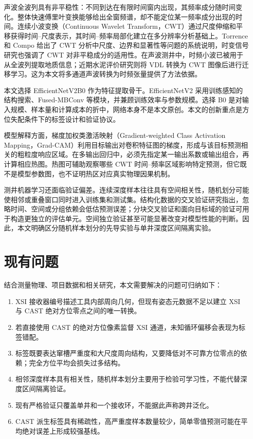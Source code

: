 声波全波列具有非平稳性：不同到达在有限时间窗内出现，其频率成分随时间变化。整体快速傅里叶变换能够给出全窗频谱，却不能定位某一频率成分出现的时间。连续小波变换（Continuous Wavelet Transform，CWT）通过尺度伸缩和平移获得时间--尺度表示，其时间--频率局部化建立在多分辨率分析基础上\cite{Mallat1989Multiresolution}。Torrence 和 Compo 给出了 CWT 分析中尺度、边界和显著性等问题的系统说明\cite{Torrence1998WaveletGuide}，时变信号研究也强调了 CWT 对非平稳成分的适用性\cite{Tary2018TimeVaryingCWT}。在声波测井中，时频小波已被用于从全波列提取地质信息\cite{Saito1997WaveletAcoustic}；近期水泥评价研究则将 VDL 转换为 CWT 图像后进行迁移学习\cite{Abdollahian2024TransferCement}。这为本文将多通道声波转换为时频张量提供了方法依据。

本文选择 EfficientNetV2B0 作为特征提取骨干。EfficientNetV2 采用训练感知的结构搜索、Fused-MBConv 等模块，并兼顾训练效率与参数规模\cite{Tan2021EfficientNetV2}。选择 B0 是对输入规模、样本量和计算成本的折中，网络本身不是本文原创。本文的创新重点是方位失配条件下的标签设计和验证协议。

模型解释方面，梯度加权类激活映射（Gradient-weighted Class Activation Mapping，Grad-CAM）利用目标输出对卷积特征图的梯度，形成与该目标预测相关的粗粒度响应区域\cite{Selvaraju2017GradCAM}。在多输出回归中，必须先指定某一输出系数或输出组合，再计算相应热图。热图可辅助观察哪些 CWT 时间--频率区域影响特定预测，但它既不是模型参数图，也不证明热区对应真实物理因果机制。

测井机器学习还面临验证偏差。连续深度样本往往具有空间相关性，随机划分可能使相邻或重叠窗口同时进入训练集和测试集。结构化数据的交叉验证研究指出，忽略时间、空间或分组依赖会低估预测误差\cite{Roberts2017CrossValidation}；分块交叉验证和面向目标域的验证可用于构造更独立的评估单元\cite{Valavi2019BlockCV,Meyer2018TargetValidation}。空间独立验证甚至可能显著改变对模型性能的判断\cite{Ploton2020SpatialValidation}。因此，本文明确区分随机样本划分的先导实验与单井深度区间隔离实验。

\section{现有问题}

结合测量物理、项目数据和相关研究，本文需要解决的问题可归纳如下：

\begin{enumerate}
  \item XSI 接收器编号描述工具内部周向几何，但现有姿态元数据不足以建立 XSI 与 CAST 绝对方位零点之间的唯一转换。
  \item 若直接使用 CAST 的绝对方位像素监督 XSI 通道，未知循环偏移会表现为标签错配。
  \item 标签既要表达窜槽严重度和大尺度周向结构，又要降低对不可靠方位零点的依赖；完全方位平均会损失过多结构。
  \item 相邻深度样本具有相关性，随机样本划分主要用于检验可学习性，不能代替深度区间隔离验证。
  \item 现有严格验证只覆盖单井和一个接收环，不能据此声称跨井泛化。
  \item CAST 派生标签具有稀疏性，高严重度样本数量较少，简单零值预测可能在平均绝对误差上形成较强基线。
\end{enumerate}

